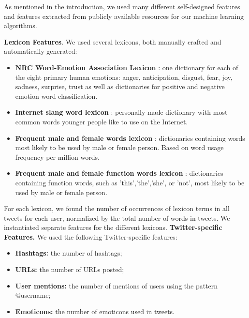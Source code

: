 \documentclass[10pt, a4paper]{article}
\begin{document}
As mentioned in the introduction, we used many different self-designed features and features extracted from publicly available resources for our machine learning algorithms.
\par\vspace{3mm}
\textbf{Lexicon Features}. We used several lexicons, both manually crafted and automatically generated:
\begin{itemize}[noitemsep,nolistsep]
\vspace{2mm}
\item \textbf{NRC Word-Emotion Association Lexicon} \citep{mohammad2013}: one dictionary for each of the eight primary human emotions: anger, anticipation, disgust, fear, joy, sadness, surprise, trust as well as dictionaries for positive and negative emotion word classification.
\vspace{1mm}
\item \textbf{Internet slang word lexicon} : personally made dictionary with most common words younger people like to use on the Internet.
\vspace{1mm}
\item \textbf{Frequent male and female words lexicon} \citep{schwartz2013}: dictionaries containing words most likely to be used by male or female person. Based on word usage frequency per million words.
\vspace{1mm}
\item \textbf{Frequent male and female function words lexicon} \citep{kiprov2015} : dictionaries containing function words, such as 'this','the','she', or 'not', most likely to be used by male or female person.
\end{itemize}
\vspace{2mm}
For each lexicon, we found the number of occurrences of lexicon terms in all tweets for each user, normalized by the total number of words in tweets. We instantiated separate features for the different lexicons.
\newpage
\textbf{Twitter-specific Features.} We used the following Twitter-specific features:
\begin{itemize}[noitemsep,nolistsep]
\vspace{1mm}
\item \textbf{Hashtags:} the number of hashtags;
\vspace{1mm}
\item \textbf{URLs:} the number of URLs posted;
\vspace{1mm}
\item \textbf{User mentions:} the number of mentions of users using the pattern @username;
\vspace{1mm}
\item \textbf{Emoticons:} the number of emoticons used in tweets.
\end{itemize}
\end{document}
